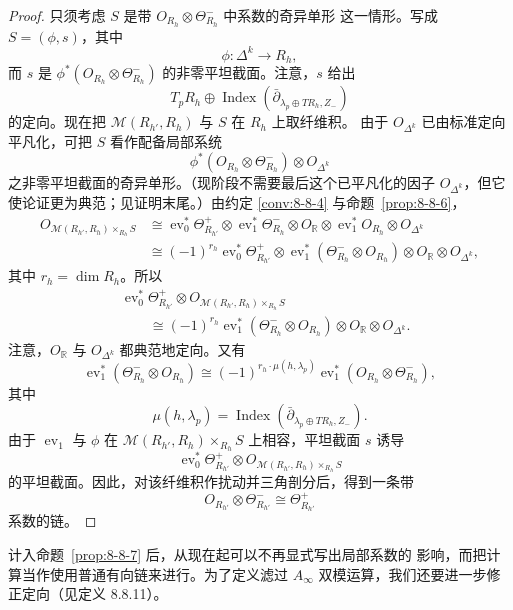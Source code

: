 \begin{proof}
只须考虑 $S$ 是带 $O_{R_h}\otimes\Theta^-_{R_h}$ 中系数的奇异单形
这一情形。写成 $S=(\phi,s)$，其中
\[
 \phi\colon\Delta^k\longrightarrow R_h,
\]
而 $s$ 是
$\phi^*(O_{R_h}\otimes\Theta^-_{R_h})$ 的非零平坦截面。注意，$s$
给出
\[
 T_pR_h\oplus
 \operatorname{Index}
 (\bar\partial_{\lambda_p\oplus TR_h,Z_-})
\]
的定向。现在把 $\mathcal M(R_{h'},R_h)$ 与 $S$ 在 $R_h$ 上取纤维积。
由于 $O_{\Delta^k}$ 已由标准定向平凡化，可把 $S$ 看作配备局部系统
\[
 \phi^*(O_{R_h}\otimes\Theta^-_{R_h})\otimes O_{\Delta^k}
\]
之非零平坦截面的奇异单形。（现阶段不需要最后这个已平凡化的因子
$O_{\Delta^k}$，但它使论证更为典范；见证明末尾。）由约定
\ref{conv:8-8-4} 与命题~\ref{prop:8-8-6}，
\[
\begin{aligned}
 O_{\mathcal M(R_{h'},R_h)\times_{R_h}S}
 &\cong
 \operatorname{ev}_0^*\Theta^+_{R_{h'}}
 \otimes\operatorname{ev}_1^*\Theta^-_{R_h}
 \otimes O_{\mathbb R}
 \otimes\operatorname{ev}_1^*O_{R_h}
 \otimes O_{\Delta^k}\\
 &\cong
 (-1)^{r_h}
 \operatorname{ev}_0^*\Theta^+_{R_{h'}}
 \otimes
 \operatorname{ev}_1^*(\Theta^-_{R_h}\otimes O_{R_h})
 \otimes O_{\mathbb R}\otimes O_{\Delta^k},
\end{aligned}
\]
其中 $r_h=\dim R_h$。所以
\[
\begin{aligned}
 &\operatorname{ev}_0^*\Theta^+_{R_{h'}}
 \otimes
 O_{\mathcal M(R_{h'},R_h)\times_{R_h}S}\\
 &\qquad\cong
 (-1)^{r_h}
 \operatorname{ev}_1^*(\Theta^-_{R_h}\otimes O_{R_h})
 \otimes O_{\mathbb R}\otimes O_{\Delta^k}.
\end{aligned}
\]
注意，$O_{\mathbb R}$ 与 $O_{\Delta^k}$ 都典范地定向。又有
\[
 \operatorname{ev}_1^*(\Theta^-_{R_h}\otimes O_{R_h})
 \cong
 (-1)^{r_h\cdot\mu(h,\lambda_p)}
 \operatorname{ev}_1^*(O_{R_h}\otimes\Theta^-_{R_h}),
\]
其中
\[
 \mu(h,\lambda_p)
 =
 \operatorname{Index}
 (\bar\partial_{\lambda_p\oplus TR_h,Z_-}).
\]
由于 $\operatorname{ev}_1$ 与 $\phi$ 在
$\mathcal M(R_{h'},R_h)\times_{R_h}S$ 上相容，平坦截面 $s$ 诱导
\[
 \operatorname{ev}_0^*\Theta^+_{R_{h'}}
 \otimes O_{\mathcal M(R_{h'},R_h)\times_{R_h}S}
\]
的平坦截面。因此，对该纤维积作扰动并三角剖分后，得到一条带
\[
 O_{R_{h'}}\otimes\Theta^-_{R_{h'}}
 \cong\Theta^+_{R_{h'}}
\]
系数的链。
\end{proof}

计入命题~\ref{prop:8-8-7} 后，从现在起可以不再显式写出局部系数的
影响，而把计算当作使用普通有向链来进行。为了定义滤过
$A_\infty$ 双模运算，我们还要进一步修正定向（见定义 8.8.11）。

